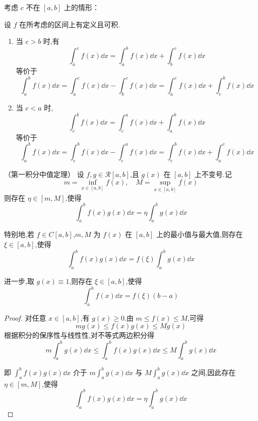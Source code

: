 考虑 $c$ 不在 $[a,b]$ 上的情形：
\begin{corollary}
	设 $f$ 在所考虑的区间上有定义且可积.
	\begin{enumerate}
		\item 当 $c>b$ 时,有
		\[
		\int_a^c f(x)\dd x = \int_a^b f(x)\dd x + \int_b^c f(x)\dd x
		\]
		等价于
		\[
		\int_a^b f(x)\dd x = \int_a^c f(x)\dd x - \int_b^c f(x)\dd x = \int_a^c f(x)\dd x + \int_c^b f(x)\dd x
		\]
		\item 当 $c < a$ 时,
		\[
		\int_c^b f(x)\dd x = \int_c^a f(x)\dd x + \int_a^b f(x)\dd x
		\]
		等价于
		\[
		\int_a^b f(x)\dd x = \int_c^b f(x)\dd x - \int_c^a f(x)\dd x = \int_c^b f(x)\dd x + \int_a^c f(x)\dd x
		\]
	\end{enumerate}
\end{corollary}
\begin{proposition}（第一积分中值定理）
	设 \( f,g \in \mathcal{R}[a,b] \),且 \( g(x) \) 在 \( [a,b] \) 上不变号.记
	\[
	m = \inf_{x \in [a,b]} f(x), \quad M = \sup_{x \in [a,b]} f(x)
	\]
	则存在 \( \eta \in [m,M] \),使得
	\[
	\int_a^b f(x)g(x) \dd x   = \eta \int_a^b g(x) \dd x
	\]
\end{proposition}
特别地,若 \( f \in C[a,b] \),\( m,M \) 为 \( f(x) \) 在 \( [a,b] \) 上的最小值与最大值,则存在 \( \xi \in [a,b] \),使得
\[
\int_a^b f(x)g(x) \dd x = f(\xi) \int_a^b g(x) \dd x
\]

进一步,取 \( g(x) \equiv 1 \),则存在 \( \xi \in [a,b] \),使得
\[
\int_a^b f(x) \dd x = f(\xi)(b-a)
\] 
\begin{proof}
	对任意 \( x \in [a,b] \),有 \( g(x) \geq 0 \).由 \( m \leq f(x) \leq M \),可得
	\[
	mg(x) \leq f(x)g(x) \leq Mg(x)
	\]
	根据积分的保序性与线性性,对不等式两边积分得
	\[
	m\int_a^b g(x) \dd x \leq \int_a^b f(x)g(x) \dd x \leq M\int_a^b g(x) \dd x
	\]
	
	即 $ \displaystyle\int_a^b f(x)g(x)\dd x$ 介于 \( m\displaystyle\int_a^b g(x)\dd x \) 与 \( M\displaystyle\int_a^b g(x)\dd x \) 之间,因此存在 \( \eta \in [m,M] \),使得
	\[
	\int_a^b f(x)g(x) \dd x = \eta \int_a^b g(x) \dd x 
	\]
	
	
\end{proof}
